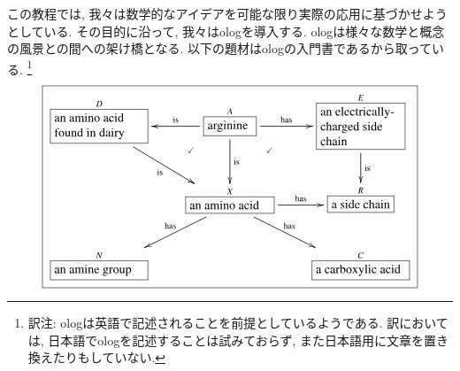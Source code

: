 
この教程では, 我々は数学的なアイデアを可能な限り実際の応用に基づかせようとしている. その目的に沿って, 我々はologを導入する. ologは様々な数学と概念の風景との間への架け橋となる. 以下の題材はologの入門書である\cite{SK}から取っている.
\footnote{訳注: ologは英語で記述されることを前提としているようである. 訳においては, 日本語でologを記述することは試みておらず, また日本語用に文章を置き換えたりもしていない.}
\begin{align}\label{dia:arginine}\fbox{\xymatrixnocompile{\obox{D}{1in}{\rr an amino acid found in dairy}\LAL{dr}{is}&\obox{A}{.5in}{arginine}\ar@{}[dl]|(.3){\checkmark}\ar@{}[dr]|(.3){\checkmark}\LA{r}{has}\LAL{l}{is}\LA{d}{is}&\obox{E}{.9in}{\rr an electrically-charged side chain}\LA{d}{is}\\&\obox{X}{.9in}{an amino acid}\LAL{dl}{has}\LA{dr}{has}\LA{r}{has}&\smbox{R}{a side chain}\\\mebox{N}{an amine group}&&\mebox{C}{a carboxylic acid}}}\end{align}  



